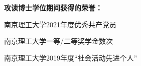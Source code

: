 \begin{publications}{99}
\vspace{1.0cm}
\item[] {{\songti{}\bf{攻读博士学位期间获得的荣誉：}}}
\setcounter{enumiv}{0}
\item  南京理工大学2021年度优秀共产党员
\item  南京理工大学一等/二等奖学金数次
\item  南京理工大学2019年度“社会活动先进个人”

\end{publications}
